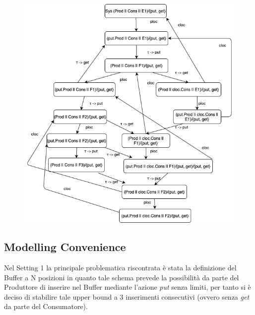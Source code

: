 \documentclass{article}
\begin{document}
\begin{figure}[h] 
\centering
\includegraphics[scale=0.55]{DGSet1.png}
\end{figure}
\subsection{Modelling Convenience}
Nel Setting 1 la principale problematica riscontrata è stata la definizione del Buffer a N posizioni in quanto tale schema prevede la possibilità da parte del Produttore di inserire nel Buffer mediante l'azione \textit{put} senza limiti, per tanto si è deciso di stabilire tale upper bound a 3 inserimenti consecutivi (ovvero senza \textit{get} da parte del Consumatore).
\clearpage
\end{document}
